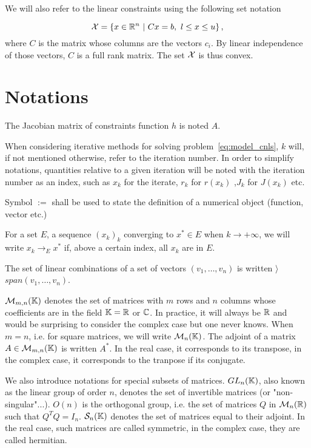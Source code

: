 \documentclass[10pt]{article}
\numberwithin{equation}{section}
\begin{document}
	We will also refer to the linear constraints using the following set notation 
	
	\begin{equation}
		\label{eq:linear_constraints}
		{\mathcal{X}} = \left\{ x \in {\mathbb{R}}^n \ | \ Cx=b,\ l \le x \le u\right\},
	\end{equation}
	where $C$ is the matrix whose columns are the vectors $c_i$. By linear independence of those vectors, $C$ is a full rank matrix. The set ${\mathcal{X}}$ is thus convex.
	
	\section*{Notations}
	 
	
	The Jacobian matrix of constraints function $h$ is noted $A$.
	
	When considering iterative methods for solving problem~\eqref{eq:model_cnls}, $k$ will, if not mentioned otherwise, refer to the iteration number. In order to simplify notations, quantities relative to a given iteration will be noted with the iteration number as an index, such as $x_k$ for the iterate, $r_k$ for $r(x_k)$ ,$J_k$ for $J(x_k)$ etc.
	
	Symbol $:=$ shall be used to state the definition of a numerical object (function, vector etc.)
	
	For a set $E$, a sequence $(x_k)_k$ converging to $x^* \in E$ when $k\to+\infty$, we will write $x_k \to_E x^*$ if, above a certain index, all $x_k$ are in $E$. 
	
	The set of linear combinations of a set of vectors $(v_1,\ldots,v_n)$ is written $\rangle$ $span(v_1,\ldots,v_n)$. 
	
	${\mathcal{M}}_{m,n}({\mathbb{K}})$ denotes the set of matrices with $m$ rows and $n$ columns whose coefficients are in the field ${\mathbb{K}} = {\mathbb{R}}$ or ${\mathbb{C}}$. In practice, it will always be ${\mathbb{R}}$ and would be surprising to consider the complex case but one never knows. When $m=n$, i.e. for square matrices, we will write ${\mathcal{M}}_n({\mathbb{K}})$. The adjoint of a matrix $A\in {\mathcal{M}}_{m,n}({\mathbb{K}})$ is written $A^*$. In the real case, it corresponds to its transpose, in the complex case, it corresponds to the tranpose if its conjugate. 
	
	We also introduce notations for special subsets of matrices. $GL_n({\mathbb{K}})$, also known as the linear group of order $n$, denotes the set of invertible matrices (or "non-singular"...). $O(n)$ is the orthogonal group, i.e. the set of matrices $Q$ in ${\mathcal{M}}_n({\mathbb{R}})$ such that $Q^TQ=I_n$. ${\mathcal{S}}_n({\mathbb{K}})$ denotes the set of matrices equal to their adjoint. In the real case, such matrices are called symmetric, in the complex case, they are called hermitian.  
	
\end{document}

